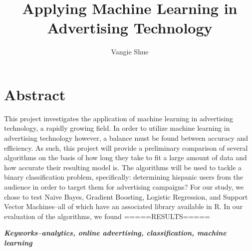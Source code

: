\documentclass[a4paper]{article}
\title{Applying Machine Learning in Advertising Technology}
\author{Vangie Shue}
\begin{document}



\maketitle
\section*{Abstract}
This project investigates the application of machine learning in advertising technology, a rapidly growing field. In order to utilize machine learning in advertising technology however, a balance must be found between accuracy and efficiency. As such, this project will provide a preliminary comparison of several algorithms on the basis of how long they take to fit a large amount of data and how accurate their resulting model is. The algorithms will be used to tackle a binary classification problem, specifically: determining hispanic users from the audience in order to target them for advertising campaigns? For our study, we chose to test Naive Bayes, Gradient Boosting, Logistic Regression, and Support Vector Machines--all of which have an associated library available in R. In our evaluation of the algorithms, we found =====RESULTS=====


\emph{\textbf{Keyworks--analytics, online advertising, classification, machine learning}}
\end{document}
